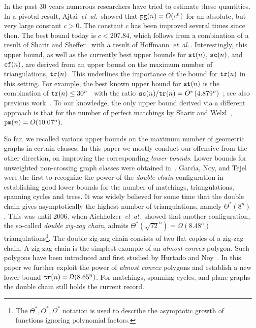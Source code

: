 \documentclass[11pt]{article}
\def\etal{{\it et~al.}\,}
\def\tr{{\tt tr}}
\def\sc{{\tt sc}}
\def\st{{\tt st}}
\def\cf{{\tt cf}}
\def\pm{{\tt pm}}
\def\pg{{\tt pg}}
\begin{document}
In the past 30 years numerous researchers have tried to estimate these
quantities. In a pivotal result, Ajtai~\etal\cite{ACNS82} showed
that $\pg(n)=O(c^n)$ for an absolute, but very large constant $c>0$.
The constant $c$ has been improved several times since then. The best
bound today is $c<207.84$, which follows from a combination of a
result of Sharir and Sheffer~\cite{SS10} with a result of
Hoffmann~\etal\cite{HSSTW11}. Interestingly, this upper bound, as well as
the currently best upper bounds for $\st(n)$, $\sc(n)$, and $\cf(n)$,
are derived from an upper bound on the maximum number of triangulations, $\tr(n)$.
This underlines the importance of the bound for $\tr(n)$ in this setting.
For example, the best known upper bound for $\st(n)$ is the combination of
$\tr(n)\leq 30^n$~\cite{SS10} with the ratio
$\sc(n)/\tr(n)=O^*\left(4.879^n\right)$~\cite{HSSTW11};
see also previous work~\cite{RSW08,SS03,SW06,SW06b}.
To our knowledge, the only upper bound derived via a different
approach is that for the number of perfect matchings by
Sharir and Welzl~\cite{SW06}, $\pm(n)=O(10.07^n)$.

So far, we recalled various upper bounds on the maximum number of
geometric graphs in certain classes. In this paper we mostly conduct
our offensive from the other direction, on improving the corresponding
\emph{lower bounds}. Lower bounds for unweighted non-crossing graph
classes were obtained in~\cite{AHV+06,D99,GNT00}.
Garc\'{\i}a, Noy, and Tejel~\cite{GNT00} were the first to recognize
the power of the {\em double chain} configuration in establishing
good lower bounds for the number of matchings, triangulations, spanning cycles and
trees. It was widely believed for some time that the double chain
gives asymptotically the highest number of triangulations, namely $\Theta^*(8^n)$.
This was until 2006, when Aichholzer~\etal\cite{AHV+06} showed that another
configuration, the so-called {\em double zig-zag chain},
admits $\Theta^*(\sqrt{72}^n)=\Omega(8.48^n)$
triangulations\footnote{The $\Theta^*,O^*, \Omega^*$ notation is used to
describe the asymptotic growth of functions ignoring polynomial
factors.}.
The double zig-zag chain consists of two flat copies of a zig-zag chain.
A zig-zag chain is the simplest example of an {\em almost convex}
polygon. Such polygons have been introduced and first studied by
Hurtado and Noy~\cite{HN97}. In this paper we further exploit
the power of {\em almost convex} polygons and establish a new lower bound
$\tr(n)=\Omega(8.65^n)$. For matchings, spanning cycles, and plane graphs
the double chain still holds the current record.
\end{document}
